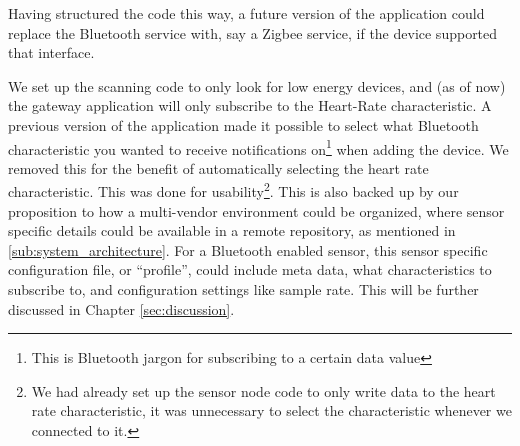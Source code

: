 Having structured the code this way, a future version of the application could replace the Bluetooth service with, say a Zigbee service, if the device supported that interface.

We set up the scanning code to only look for low energy devices, and (as of now) the gateway application will only subscribe to the Heart-Rate characteristic. A previous version of the application made it possible to select what Bluetooth characteristic you wanted to receive notifications on\footnote{ This is Bluetooth jargon for subscribing to a certain data value} when adding the device. We removed this for the benefit of automatically selecting the heart rate characteristic. This was done for usability\footnote{ We had already set up the sensor node code to only write data to the heart rate characteristic, it was unnecessary to select the characteristic whenever we connected to it.}. This is also backed up by our proposition to how a multi-vendor environment could be organized, where sensor specific details could be available in a remote repository, as mentioned in \ref{sub:system_architecture}. For a Bluetooth enabled sensor, this sensor specific configuration file, or ``profile'', could include meta data, what characteristics to subscribe to, and configuration settings like sample rate. This will be further discussed in Chapter \ref{sec:discussion}.

